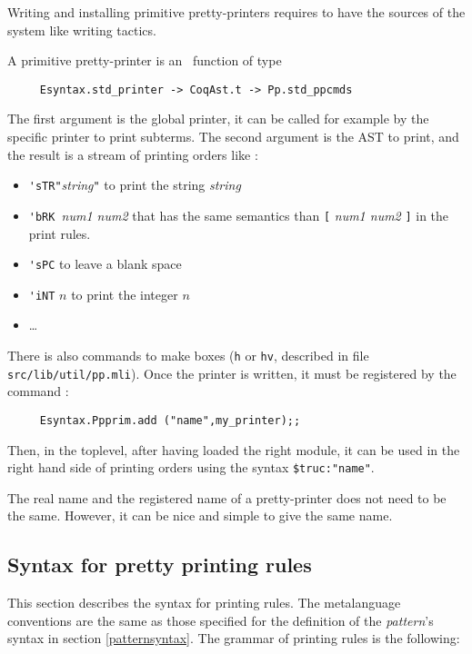 Writing and installing primitive pretty-printers requires to have the
sources of the system like writing tactics.

A primitive pretty-printer is an \ocaml\ function of type
\begin{verbatim}
     Esyntax.std_printer -> CoqAst.t -> Pp.std_ppcmds
\end{verbatim}
The first
argument is the global printer, it can be called for example by the
specific printer to print subterms. The second argument is the AST to
print, and the result is a stream of printing orders like :

\begin{itemize}
\item \verb+'sTR"+\textit{string}\verb+"+ to print the string
  \textit{string}
\item \verb+'bRK +\textit{num1 num2} that has the same semantics than
  \verb+[+ \textit{num1 num2} \verb+]+ in the print rules.
\item \verb+'sPC+ to leave a blank space
\item \verb+'iNT+ $n$ to print the integer $n$ 
\item \ldots
\end{itemize}

There is also commands to make boxes (\verb+h+ or \verb+hv+, described
in file {\tt src/lib/util/pp.mli}). Once the printer is written, it
must be registered by the command :
\begin{verbatim}
     Esyntax.Ppprim.add ("name",my_printer);;
\end{verbatim}
\noindent 
Then, in the toplevel, after having loaded the right {\ocaml} module,
it can be used in the right hand side of printing orders using the
syntax \verb+$truc:"name"+.

The real name and the registered name of a pretty-printer does not
need to be the same. However, it can be nice and simple to give the
same name.

\subsection{Syntax for pretty printing rules}
\label{syntaxsyntax}

This section describes the syntax for printing rules.  The
metalanguage conventions are the same as those specified for the
definition of the {\sl pattern}'s syntax in section \ref{patternsyntax}.
The grammar of printing rules is the following:

